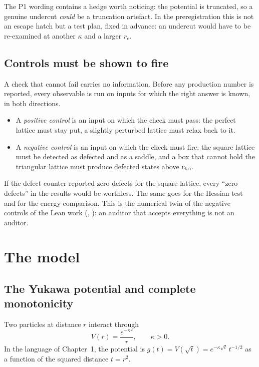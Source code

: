 The P1 wording contains a hedge worth noticing: the potential is truncated, so a genuine undercut \emph{could} be a
truncation artefact. In the preregistration this is not an escape hatch but a test plan, fixed in advance: an undercut
would have to be re-examined at another $\kappa$ and a larger $r_c$.

\subsection{Controls must be shown to fire}
A check that cannot fail carries no information. Before any production number is reported, every observable is run on
inputs for which the right answer is known, in both directions.
\begin{itemize}
\item A \emph{positive control} is an input on which the check must pass: the perfect lattice must stay put, a slightly
perturbed lattice must relax back to it.
\item A \emph{negative control} is an input on which the check must fire: the square lattice must be detected as
defected and as a saddle, and a box that cannot hold the triangular lattice must produce defected states above
$e_{\rm tri}$.
\end{itemize}
If the defect counter reported zero defects for the square lattice, every ``zero defects'' in the results would be
worthless. The same goes for the Hessian test and for the energy comparison. This is the numerical twin of the negative
controls of the Lean work (, ): an auditor that accepts
everything is not an auditor.

\section{The model}\label{sec:num-model}

\subsection{The Yukawa potential and complete monotonicity}
Two particles at distance $r$ interact through
\begin{equation}\label{eq:yukawa}
V(r)=\frac{e^{-\kappa r}}{r},\qquad \kappa>0 .
\end{equation}
In the language of Chapter~1, the potential is $g(t)=V(\sqrt t)=e^{-\kappa\sqrt t}\,t^{-1/2}$ as a function of the
squared distance $t=r^2$.

